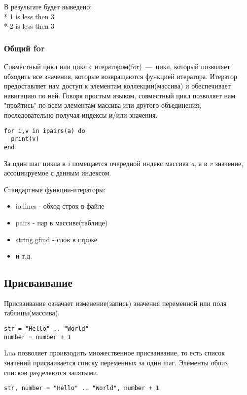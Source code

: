 В результате будет выведено: 
\\* 1 is less then 3
\\* 2 is less then 3

\subsubsection{Общий for}

Совместный цикл или цикл с итератором(for)~---~цикл, который позволяет обходить все значения, которые возвращаются функцией итератора. Итератор предоставляет нам доступ к элементам коллекции(массива) и обеспечивает навигацию по ней. Говоря простым языком, совместный цикл позволяет нам "пройтись" по всем элементам массива или другого объединения, последовательно получая индексы и/или значения. 

\begin{lstlisting}
for i,v in ipairs(a) do 
  print(v) 
end
\end{lstlisting}

За один шаг цикла в \emph{i} помещается очередной индекс массива \emph{a}, а в \emph{v} значение, ассоциируемое с данным индексом. 

Стандартные функции-итераторы:
\begin{itemize}
	\item io.lines - обход строк в файле
	\item pairs - пар в массиве(таблице)
	\item string.gfind - слов в строке 
	\item и т.д.
\end{itemize}

  
\subsection{Присваивание}

Присваивание означает изменение(запись) значения переменной или поля таблицы(массива).

\begin{lstlisting}
str = "Hello" .. "World"
number = number + 1
\end{lstlisting}

Lua позволяет проивзодить множественное присваивание, то есть список значений присваивается списку переменных за один шаг. Элементы обоиз списков разделяются запятыми. 

\begin{lstlisting}
str, number = "Hello" .. "World", number + 1
\end{lstlisting}

